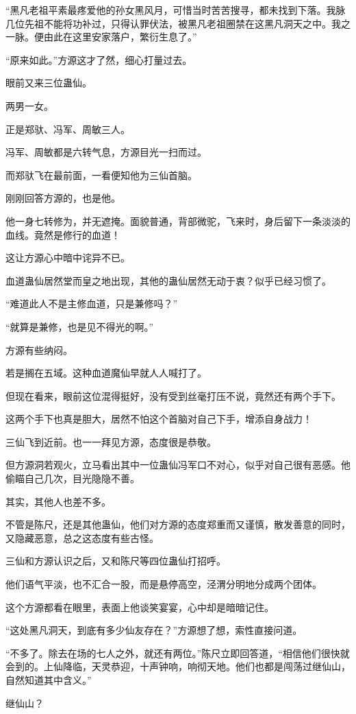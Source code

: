 \begin{this_body}
“黑凡老祖平素最疼爱他的孙女黑风月，可惜当时苦苦搜寻，都未找到下落。我脉几位先祖不能将功补过，只得认罪伏法，被黑凡老祖圈禁在这黑凡洞天之中。我之一脉。便由此在这里安家落户，繁衍生息了。”

“原来如此。”方源这才了然，细心打量过去。

眼前又来三位蛊仙。

两男一女。

正是郑驮、冯军、周敏三人。

冯军、周敏都是六转气息，方源目光一扫而过。

而郑驮飞在最前面，一看便知他为三仙首脑。

刚刚回答方源的，也是他。

他一身七转修为，并无遮掩。面貌普通，背部微驼，飞来时，身后留下一条淡淡的血线。竟然是修行的血道！

这让方源心中暗中诧异不已。

血道蛊仙居然堂而皇之地出现，其他的蛊仙居然无动于衷？似乎已经习惯了。

“难道此人不是主修血道，只是兼修吗？”

“就算是兼修，也是见不得光的啊。”

方源有些纳闷。

若是搁在五域。这种血道魔仙早就人人喊打了。

但现在看来，眼前这位混得挺好，没有受到丝毫打压不说，竟然还有两个手下。

这两个手下也真是胆大，居然不怕这个首脑对自己下手，增添自身战力！

三仙飞到近前。也一一拜见方源，态度很是恭敬。

但方源洞若观火，立马看出其中一位蛊仙冯军口不对心，似乎对自己很有恶感。他偷瞄自己几次，目光隐隐不善。

其实，其他人也差不多。

不管是陈尺，还是其他蛊仙，他们对方源的态度郑重而又谨慎，散发善意的同时，又隐藏恶意，总之这态度有些古怪。

三仙和方源认识之后，又和陈尺等四位蛊仙打招呼。

他们语气平淡，也不汇合一股，而是悬停高空，泾渭分明地分成两个团体。

这个方源都看在眼里，表面上他谈笑宴宴，心中却是暗暗记住。

“这处黑凡洞天，到底有多少仙友存在？”方源想了想，索性直接问道。

“不多了。除去在场的七人之外，就还有两位。”陈尺立即回答道，“相信他们很快就会到的。上仙降临，天灵恭迎，十声钟响，响彻天地。他们也都是闯荡过继仙山，自然知道其中含义。”

继仙山？


\end{this_body}
